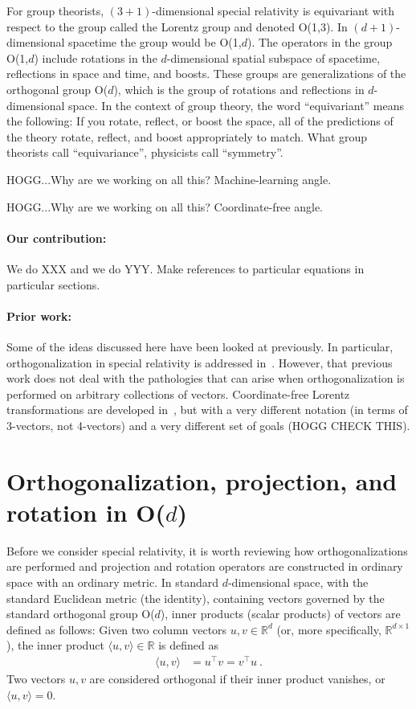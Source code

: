 \documentclass{article}
\newcommand{\inner}[2]{\langle{#1},{#2}\rangle}
\begin{document}
For group theorists, $(3+1)$-dimensional special relativity is equivariant with respect to the group called the Lorentz group and denoted O(1,3).
In $(d+1)$-dimensional spacetime the group would be O(1,$d$).
The operators in the group O(1,$d$) include rotations in the $d$-dimensional spatial subspace of spacetime, reflections in space and time, and boosts.
These groups are generalizations of the orthogonal group O($d$), which is the group of rotations and reflections in $d$-dimensional space.
In the context of group theory, the word ``equivariant'' means the following:
If you rotate, reflect, or boost the space, all of the predictions of the theory rotate, reflect, and boost appropriately to match.
What group theorists call ``equivariance'', physicists call ``symmetry''.

HOGG...Why are we working on all this? Machine-learning angle.

HOGG...Why are we working on all this? Coordinate-free angle.

\paragraph{Our contribution:}
We do XXX and we do YYY. Make references to particular equations in particular sections.

\paragraph{Prior work:}
Some of the ideas discussed here have been looked at previously.
In particular, orthogonalization in special relativity is addressed in~\cite{joot}.
However, that previous work does not deal with the pathologies that can arise when orthogonalization is performed on arbitrary collections of vectors.
Coordinate-free Lorentz transformations are developed in~\cite{wagner}, but with a very different notation (in terms of 3-vectors, not 4-vectors) and a very different set of goals (HOGG CHECK THIS).

\section{Orthogonalization, projection, and rotation in O($d$)}\label{sec:od}

Before we consider special relativity, it is worth reviewing how orthogonalizations are performed and projection and rotation operators are constructed in ordinary space with an ordinary metric.
In standard $d$-dimensional space, with the standard Euclidean metric (the identity), containing vectors governed by the standard orthogonal group O($d$), inner products (scalar products) of vectors are defined as follows:
Given two column vectors $u,v\in\mathbb{R}^d$ (or, more specifically, $\mathbb{R}^{d\times1}$), the inner product $\inner{u}{v}\in\mathbb{R}$ is defined as
\begin{align}
    \inner{u}{v} &= u^\top v = v^\top u ~.
\end{align}
Two vectors $u,v$ are considered orthogonal if their inner product vanishes, or $\inner{u}{v}=0$.
\end{document}
